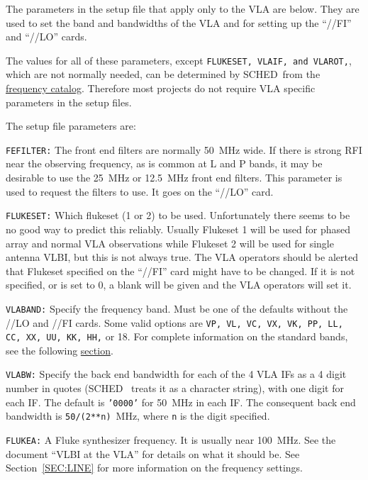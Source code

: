\documentclass{report}
\newcommand{\schedb}{{\sc SCHED~}}
\begin{document}
The parameters in the setup file that apply only to the VLA are
below. They are used to set the band and bandwidths of the VLA and
for setting up the ``//FI'' and ``//LO''  cards.

The values for all of these parameters, except {\tt FLUKESET, VLAIF,
and VLAROT,}, which are not normally needed, can be determined by
\schedb from the 
{\hyperref[SSEC:FREQLST]{frequency catalog}}.  Therefore
most projects do not require VLA specific parameters in the setup
files.

The setup file parameters are:

\begin{list}{}{\parsep 0em  \itemsep 0em }

\item {\tt FEFILTER:} The front end filters are
normally 50~MHz wide. If there is strong RFI near the observing
frequency, as is common at L and P bands, it may be desirable to use
the 25~MHz or 12.5~MHz front end filters. This parameter is used to
request the filters to use. It goes on the ``//LO'' card.

\item {\tt FLUKESET:} Which flukeset (1 or 2)
to be used. Unfortunately there seems to be no good way to predict
this reliably. Usually Flukeset 1 will be used for phased array and
normal VLA observations while Flukeset 2 will be used for single
antenna VLBI, but this is not always true. The VLA operators should be
alerted that Flukeset specified on the ``//FI'' card might have to be
changed. If it is not specified, or is set to 0, a blank will be given
and the VLA operators will set it.

\item {\tt VLABAND:} Specify the frequency band.
Must be one of the defaults without the //LO and //FI cards.  Some
valid options are {\tt VP, VL, VC, VX, VK, PP, LL, CC, XX, UU, KK,
HH,} or 18.  For complete information on the standard bands, see
the following 
{\hyperref[SSEC:VLASTDBD]{section}}.

\item {\tt VLABW:} Specify the back end bandwidth
for each of the 4 VLA IFs as a 4 digit number in quotes (\schedb
treats it as a character string), with one digit for each IF. The
default is {\tt '0000'} for 50~MHz in each IF. The consequent back end
bandwidth is {\tt 50/(2**n)}~MHz, where {\tt n} is the digit
specified.

\item {\tt FLUKEA:} A Fluke synthesizer frequency.
It is usually near 100~MHz. See the document ``VLBI at the VLA'' for
details on what it should be. See Section~\ref{SEC:LINE} for more
information on the frequency settings.


\end{list}
\end{document}
